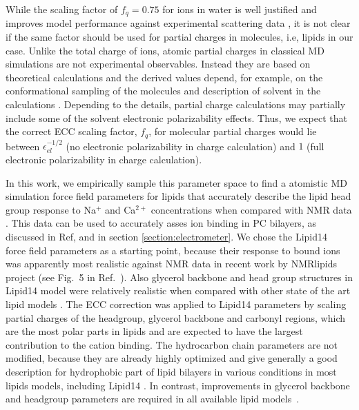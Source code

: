 \documentclass[aip,jcp,twocolumn]{revtex4}
\begin{document}
While the scaling factor of $f_q = 0.75$ for ions in water is well justified and 
improves model performance against experimental scattering data \cite{kohagen14,kohagen16, Pluharova2014},
it is not clear if the same factor should be used for partial charges in molecules,
i.e, lipids in our case. Unlike the total charge of ions, atomic partial charges in
classical MD simulations are not experimental observables.
Instead they are based on theoretical calculations and the
derived values depend, for example, on the conformational
sampling of the molecules and description of solvent 
in the calculations \cite{RESP_paper,??}. 
Depending to the details, partial charge calculations may partially
include some of the solvent electronic polarizability effects. Thus, we expect that
the correct ECC scaling factor, $f_q$, for molecular partial charges would lie
between $\epsilon _{el} ^{-1/2}$ (no electronic polarizability in charge calculation)
and $1$ (full electronic polarizability in charge calculation).

In this work, we empirically sample this parameter space
to find a atomistic MD simulation force field parameters for lipids that
accurately describe the lipid head group response to Na$^+$ and Ca$^{2+}$ concentrations
when compared with NMR data \cite{akutsu81,altenbach84}. This data can be used to accurately asses
ion binding in PC bilayers, as discussed in Ref,  and in section \ref{section:electrometer}.
We chose the Lipid14~\cite{dickson14} force field parameters as a starting point,
because their response to bound ions was apparently most realistic against NMR data
in recent work by NMRlipids project (see Fig.~5 in Ref.~).
Also glycerol backbone and head group structures in Lipid14 model were
relatively realistic when compared with other state of the art lipid models \cite{botan15}.
The ECC correction was applied to Lipid14 parameters by scaling partial charges of the headgroup,
glycerol backbone and carbonyl regions, which are the most polar parts in lipids and
are expected to have the largest contribution to the cation binding.
The hydrocarbon chain parameters are not modified, because they are
already highly optimized and give generally a good description for
hydrophobic part of lipid bilayers in various conditions
in most lipids models, including Lipid14 \cite{ollila16}.
In contrast, improvements in glycerol backbone and headgroup
parameters are required in all available lipid models~\cite{botan15}. 
\end{document}
